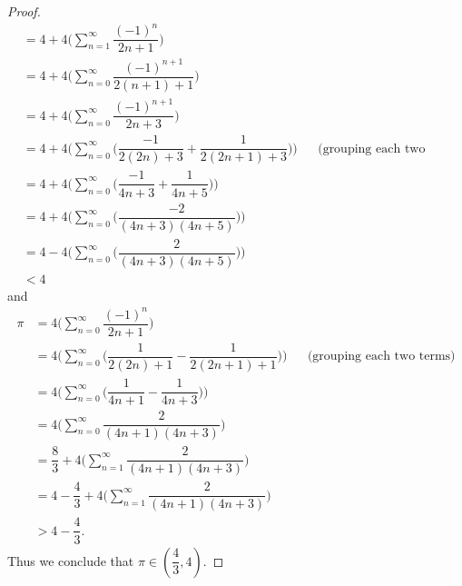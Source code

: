 \begin{proof}
\begin{align*}
        & = 4 + 4 \bigg(\sum_{n = 1}^\infty \dfrac{(-1)^n}{2n + 1}\bigg)                                                                             \\
        & = 4 + 4 \bigg(\sum_{n = 0}^\infty \dfrac{(-1)^{n + 1}}{2(n + 1) + 1}\bigg)                                                                 \\
        & = 4 + 4 \bigg(\sum_{n = 0}^\infty \dfrac{(-1)^{n + 1}}{2n + 3}\bigg)                                                                       \\
        & = 4 + 4 \Bigg(\sum_{n = 0}^\infty \bigg(\dfrac{-1}{2(2n) + 3} + \dfrac{1}{2(2n + 1) + 3}\bigg)\Bigg) &  & \text{(grouping each two terms)} \\
        & = 4 + 4 \Bigg(\sum_{n = 0}^\infty \bigg(\dfrac{-1}{4n + 3} + \dfrac{1}{4n + 5}\bigg)\Bigg)                                                 \\
        & = 4 + 4 \Bigg(\sum_{n = 0}^\infty \bigg(\dfrac{-2}{(4n + 3)(4n + 5)}\bigg)\Bigg)                                                           \\
        & = 4 - 4 \Bigg(\sum_{n = 0}^\infty \bigg(\dfrac{2}{(4n + 3)(4n + 5)}\bigg)\Bigg)                                                            \\
        & < 4
  \end{align*}
  and
  \begin{align*}
    \pi & = 4 \bigg(\sum_{n = 0}^\infty \dfrac{(-1)^n}{2n + 1}\bigg)                                                                            \\
        & = 4 \Bigg(\sum_{n = 0}^\infty \bigg(\dfrac{1}{2(2n) + 1} - \dfrac{1}{2(2n + 1) + 1}\bigg)\Bigg) &  & \text{(grouping each two terms)} \\
        & = 4 \Bigg(\sum_{n = 0}^\infty \bigg(\dfrac{1}{4n + 1} - \dfrac{1}{4n + 3}\bigg)\Bigg)                                                 \\
        & = 4 \bigg(\sum_{n = 0}^\infty \dfrac{2}{(4n + 1)(4n + 3)}\bigg)                                                                       \\
        & = \dfrac{8}{3} + 4 \bigg(\sum_{n = 1}^\infty \dfrac{2}{(4n + 1)(4n + 3)}\bigg)                                                        \\
        & = 4 - \dfrac{4}{3} + 4 \bigg(\sum_{n = 1}^\infty \dfrac{2}{(4n + 1)(4n + 3)}\bigg)                                                    \\
        & > 4 - \dfrac{4}{3}.
  \end{align*}
  Thus we conclude that \(\pi \in (\dfrac{4}{3}, 4)\).
\end{proof}


